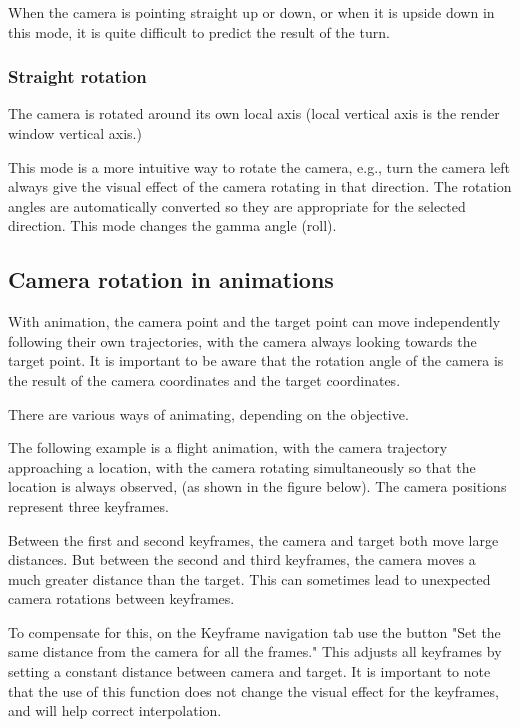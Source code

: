 When the camera is pointing straight up or down, or when it is upside
down in this mode, it is quite difficult to predict the result of the
turn.

\subsubsection{Straight rotation}\label{straight-rotation}

The camera is rotated around its own local axis (local vertical axis is
the render window vertical axis.)

This mode is a more intuitive way to rotate the camera, e.g., turn the
camera left always give the visual effect of the camera rotating in that
direction. The rotation angles are automatically converted so they are
appropriate for the selected direction. This mode changes the gamma
angle (roll).

\subsection{Camera rotation in
animations}\label{camera-rotation-in-animations}

With animation, the camera point and the target point can move
independently following their own trajectories, with the camera always
looking towards the target point. It is important to be aware that the
rotation angle of the camera is the result of the camera coordinates and
the target coordinates.

There are various ways of animating, depending on the objective.

The following example is a flight animation, with the camera trajectory
approaching a location, with the camera rotating simultaneously so that
the location is always observed, (as shown in the figure below). The
camera positions represent three keyframes.

Between the first and second keyframes, the camera and target both move
large distances. But between the second and third keyframes, the camera
moves a much greater distance than the target. This can sometimes lead
to unexpected camera rotations between keyframes.

To compensate for this, on the Keyframe navigation tab use the button
"Set the same distance from the camera for all the frames." This adjusts
all keyframes by setting a constant distance between camera and target.
It is important to note that the use of this function does not change
the visual effect for the keyframes, and will help correct
interpolation.

